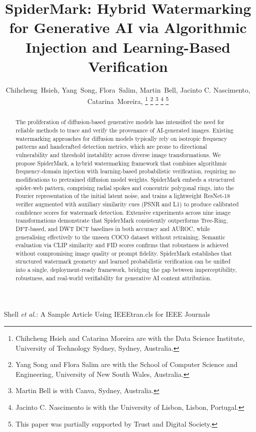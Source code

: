 \documentclass[lettersize,journal,review]{IEEEtran}
\begin{document}
\title{SpiderMark: Hybrid Watermarking for Generative AI via Algorithmic Injection and Learning-Based Verification}

\author{Chihcheng~Hsieh,
        Yang~Song,
        Flora~Salim,
        Martin~Bell,
        Jacinto C. Nascimento,
        Catarina~Moreira,
\thanks{Chihcheng Hsieh and Catarina Moreira are with the Data Science Institute, University of Technology Sydney, Sydney, Australia.}
\thanks{Yang Song and Flora Salim are with the School of Computer Science and Engineering, University of New South Wales, Australia.}
\thanks{Martin Bell is with Canva, Sydney, Australia.}
\thanks{Jacinto C. Nascimento is with the University of Lisbon, Lisbon, Portugal.}
\thanks{This paper was partially supported by Trust and Digital Society.}
}


%
{Shell \MakeLowercase{\textit{et al.}}: A Sample Article Using IEEEtran.cls for IEEE Journals}


\maketitle

\begin{abstract}
The proliferation of diffusion-based generative models has intensified the need for reliable methods to trace and verify the provenance of AI-generated images. Existing watermarking approaches for diffusion models typically rely on isotropic frequency patterns and handcrafted detection metrics, which are prone to directional vulnerability and threshold instability across diverse image transformations. We propose SpiderMark, a hybrid watermarking framework that combines algorithmic frequency-domain injection with learning-based probabilistic verification, requiring no modifications to pretrained diffusion model weights. SpiderMark embeds a structured spider-web pattern, comprising radial spokes and concentric polygonal rings, into the Fourier representation of the initial latent noise, and trains a lightweight ResNet-18 verifier augmented with auxiliary similarity cues (PSNR and L1) to produce calibrated confidence scores for watermark detection. Extensive experiments across nine image transformations demonstrate that SpiderMark consistently outperforms Tree-Ring, DFT-based, and DWT DCT baselines in both accuracy and AUROC, while generalising effectively to the unseen COCO dataset without retraining. Semantic evaluation via CLIP similarity and FID scores confirms that robustness is achieved without compromising image quality or prompt fidelity. SpiderMark establishes that structured watermark geometry and learned probabilistic verification can be unified into a single, deployment-ready framework, bridging the gap between imperceptibility, robustness, and real-world verifiability for generative AI content attribution.
\end{abstract}
\end{document}
